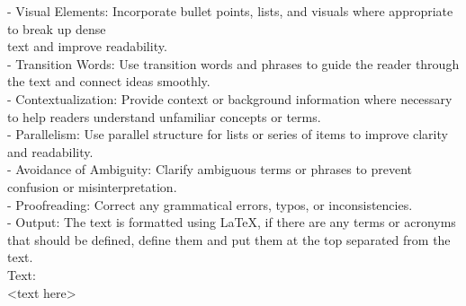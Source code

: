 - Visual Elements: Incorporate bullet points, lists, and visuals where appropriate to break up dense \\ 
text and improve readability. \\ 
- Transition Words: Use transition words and phrases to guide the reader through the text and connect ideas smoothly. \\ 
- Contextualization: Provide context or background information where necessary to help readers understand unfamiliar concepts or terms. \\ 
- Parallelism: Use parallel structure for lists or series of items to improve clarity and readability. \\ 
- Avoidance of Ambiguity: Clarify ambiguous terms or phrases to prevent confusion or misinterpretation. \\ 
- Proofreading: Correct any grammatical errors, typos, or inconsistencies. \\ 
- Output: The text is formatted using LaTeX, if there are any terms or acronyms that should be defined, define them and put them at the top separated from the text. \\ 
Text: \\ 
<text here>